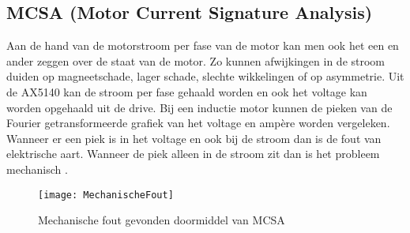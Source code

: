 \subsection{\gls{MCSA} (Motor Current Signature Analysis)}

Aan de hand van de motorstroom per fase van de motor kan men ook het een en ander zeggen over de staat van de motor. Zo kunnen afwijkingen in de stroom duiden op magneetschade, lager schade, slechte wikkelingen of op asymmetrie. Uit de AX5140 kan de stroom per fase gehaald worden en ook het voltage kan worden opgehaald uit de drive. Bij een inductie motor kunnen de pieken van de Fourier getransformeerde grafiek van het voltage en ampère worden vergeleken. Wanneer er een piek is in het voltage en ook bij de stroom dan is de fout van elektrische aart. Wanneer de piek alleen in de stroom zit dan is het probleem mechanisch \cite{web:MCSA}.

\begin{figure}[H]
	\centering
	\texttt{[image: MechanischeFout]}
	\label{fig:MechanischeFout}
	\caption{Mechanische fout gevonden doormiddel van MCSA \cite{web:MCSA}}
\end{figure}

